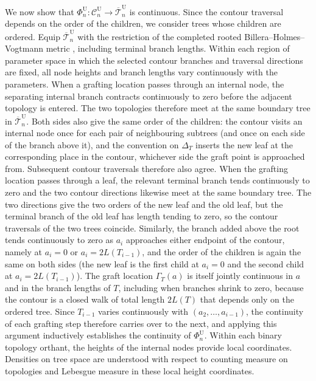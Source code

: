 \documentclass{article}
\begin{document}
We now show that
$\Phi_n^\mathrm{U}:\mathcal{C}_n^\mathrm{U}\rightarrow
\overline{\mathcal{T}}_n^\mathrm{U}$ is continuous. 
Since the contour traversal depends on the order of the children, we consider
trees whose children are ordered. 
Equip $\overline{\mathcal{T}}_n^\mathrm{U}$ with the restriction of the completed
rooted Billera--Holmes--Vogtmann metric \citep{Billera2001}, including
terminal branch lengths. Within each region of parameter
space in which the selected contour branches and traversal directions are
fixed, all node heights and branch lengths vary continuously with the
parameters. When a grafting location passes through an internal node, the separating
internal branch contracts continuously to zero before the adjacent
topology is entered. The two topologies therefore meet at the same
boundary tree in $\overline{\mathcal{T}}_n^\mathrm{U}$. 
Both sides also give the same order of the children: the contour visits an
internal node once for each pair of neighbouring subtrees (and once on each
side of the branch above it), and the convention on $\Delta_T$ inserts the new
leaf at the corresponding place in the contour, whichever side the graft point
is approached from. Subsequent contour traversals therefore also agree.
When the grafting location passes through a leaf, the relevant terminal branch
tends continuously to zero and the two contour directions likewise meet at the
same boundary tree. The two directions give the two orders of the new leaf and
the old leaf, but the terminal branch of the old leaf has length tending to
zero, so the contour traversals of the two trees coincide. Similarly, the
branch added above the root tends continuously to zero as $a_i$ approaches
either endpoint of the contour, namely at $a_i=0$ or $a_i=2L(T_{i-1})$, and
the order of the children is again the same on both sides (the new leaf is the
first child at $a_i=0$ and the second child at $a_i=2L(T_{i-1})$).
The graft location $\Gamma_T(a)$ is itself jointly continuous in $a$ and in the branch lengths of $T$, 
including when branches shrink to zero, because the contour is a closed walk of total length $2L(T)$ 
that depends only on the ordered tree. Since $T_{i-1}$ varies continuously with $(a_2, …, a_{i-1})$, 
the continuity of each grafting step therefore carries over to the next, and applying this argument inductively establishes the continuity of $\Phi^{\mathrm U}_n$. 
Within each binary topology orthant, the
heights of the internal nodes provide local coordinates. Densities on tree
space are understood with respect to counting measure on topologies and
Lebesgue measure in these local height coordinates.
\end{document}
